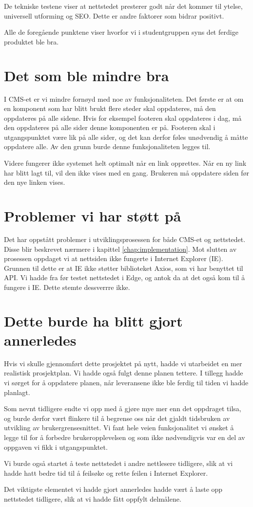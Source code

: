 De tekniske testene viser at nettstedet presterer godt når det kommer til ytelse, universell utforming og SEO. Dette er andre faktorer som bidrar positivt.

Alle de foregående punktene viser hvorfor vi i studentgruppen syns det ferdige produktet ble bra.

\section{Det som ble mindre bra}
I CMS-et er vi mindre fornøyd med noe av funksjonaliteten. Det første er at om en komponent som har blitt brukt flere steder skal oppdateres, må den oppdateres på alle sidene. Hvis for eksempel footeren skal oppdateres i dag, må den oppdateres på alle sider denne komponenten er på. Footeren skal i utgangspunktet være lik på alle sider, og det kan derfor føles unødvendig å måtte oppdatere alle. Av den grunn burde denne funksjonaliteten legges til.

Videre fungerer ikke systemet helt optimalt når en link opprettes. Når en ny link har blitt lagt til, vil den ikke vises med en gang. Brukeren må oppdatere siden før den nye linken vises.

\section{Problemer vi har støtt på}
Det har oppstått problemer i utviklingsprosessen for både CMS-et og nettstedet. Disse blir beskrevet nærmere i kapittel \ref{chap:implementation}.  Mot slutten av prosessen oppdaget vi at nettsiden ikke fungerte i Internet Explorer (IE). Grunnen til dette er at IE ikke støtter biblioteket Axios, som vi har benyttet til API. Vi hadde fra før testet nettstedet i Edge, og antok da at det også kom til å fungere i IE. Dette stemte dessverrre ikke.

\section{Dette burde ha blitt gjort annerledes}
Hvis vi skulle gjennomført dette prosjektet på nytt, hadde vi utarbeidet en mer realistisk prosjektplan. Vi hadde også fulgt denne planen tettere. I tillegg hadde vi sørget for å oppdatere planen, når leveransene ikke ble ferdig til tiden vi hadde planlagt.

Som nevnt tidligere endte vi opp med å gjøre mye mer enn det oppdraget tilsa, og burde derfor vært flinkere til å begrense oss når det gjaldt tidsbruken av utvikling av brukergrensesnittet. Vi fant hele veien funksjonalitet vi ønsket å legge til for å forbedre brukeropplevelsen og som ikke nødvendigvis var en del av oppgaven vi fikk i utgangspunktet. 

Vi burde også startet å teste nettstedet i andre nettlesere tidligere, slik at vi hadde hatt bedre tid til å feilsøke og rette feilen i Internet Explorer.

Det viktigste elementet vi hadde gjort annerledes hadde vært å laste opp nettstedet tidligere, slik at vi hadde fått oppfylt delmålene. 
